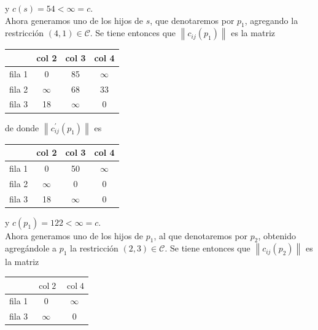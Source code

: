 \documentclass[10pt]{article}
\begin{document}
y $c(s)=54<\infty=c$.\\
Ahora generamos uno de los hijos de $s$, que denotaremos por $p_{1}$, agregando la restricción $(4,1) \in \mathcal{C}$. Se tiene entonces que $\left\|c_{i j}\left(p_{1}\right)\right\|$ es la matriz

\begin{center}
\begin{tabular}{|l|c|c|c|}
\hline
 & col 2 & col 3 & col 4 \\
\hline
fila 1 & 0 & 85 & $\infty$ \\
\hline
fila 2 & $\infty$ & 68 & 33 \\
\hline
fila 3 & 18 & $\infty$ & 0 \\
\hline
\end{tabular}
\end{center}

de donde $\left\|c_{i j}^{\prime}\left(p_{1}\right)\right\|$ es

\begin{center}
\begin{tabular}{|l|c|c|c|}
\hline
 & col 2 & col 3 & col 4 \\
\hline
fila 1 & 0 & 50 & $\infty$ \\
\hline
fila 2 & $\infty$ & 0 & 0 \\
\hline
fila 3 & 18 & $\infty$ & 0 \\
\hline
\end{tabular}
\end{center}

y $c\left(p_{1}\right)=122<\infty=c$.\\
Ahora generamos uno de los hijos de $p_{1}$, al que denotaremos por $p_{2}$, obtenido agregándole a $p_{1}$ la restricción $(2,3) \in \mathcal{C}$. Se tiene entonces que $\left\|c_{i j}\left(p_{2}\right)\right\|$ es la matriz

\begin{center}
\begin{tabular}{|l|c|c|}
\hline
 & $\operatorname{col} 2$ & $\operatorname{col} 4$ \\
\hline
fila 1 & 0 & $\infty$ \\
\hline
fila 3 & $\infty$ & 0 \\
\hline
\end{tabular}
\end{center}
\end{document}
